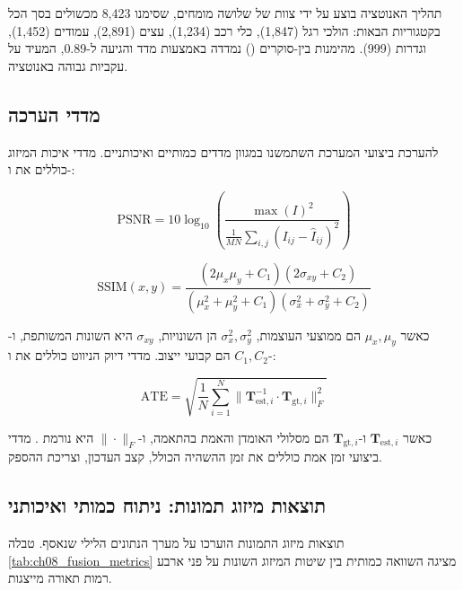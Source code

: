 תהליך האנוטציה בוצע על ידי צוות של שלושה מומחים, שסימנו 8,423 מכשולים בסך הכל בקטגוריות הבאות: הולכי רגל (1,847), כלי רכב (1,234), עצים (2,891), עמודים (1,452), וגדרות (999). מהימנות בין-סוקרים () נמדדה באמצעות מדד  והגיעה ל-0.89, המעיד על עקביות גבוהה באנוטציה.

\subsection{מדדי הערכה}
\label{sec:ch08_metrics}

להערכת ביצועי המערכת השתמשנו במגוון מדדים כמותיים ואיכותניים. מדדי איכות המיזוג כוללים את  ו-:

\begin{equation}
\text{PSNR} = 10 \log_{10} \left( \frac{\max(I)^2}{\frac{1}{MN} \sum_{i,j} (I_{ij} - \hat{I}_{ij})^2} \right)
\label{eq:ch08_psnr}
\end{equation}

\begin{equation}
\text{SSIM}(x, y) = \frac{(2\mu_x \mu_y + C_1)(2\sigma_{xy} + C_2)}{(\mu_x^2 + \mu_y^2 + C_1)(\sigma_x^2 + \sigma_y^2 + C_2)}
\label{eq:ch08_ssim}
\end{equation}

כאשר $\mu_x, \mu_y$ הם ממוצעי העוצמות, $\sigma_x^2, \sigma_y^2$ הן השונויות, $\sigma_{xy}$ היא השונות המשותפת, ו-$C_1, C_2$ הם קבועי ייצוב. מדדי דיוק הניווט כוללים את  ו-:

\begin{equation}
\text{ATE} = \sqrt{\frac{1}{N} \sum_{i=1}^N \| \mathbf{T}_{\text{est}, i}^{-1} \cdot \mathbf{T}_{\text{gt}, i} \|_F^2}
\label{eq:ch08_ate}
\end{equation}

כאשר $\mathbf{T}_{\text{est}, i}$ ו-$\mathbf{T}_{\text{gt}, i}$ הם מסלולי האומדן והאמת בהתאמה, ו-$\|\cdot\|_F$ היא נורמת . מדדי ביצועי זמן אמת כוללים את זמן ההשהיה הכולל, קצב העדכון, וצריכת ההספק.

\subsection{תוצאות מיזוג תמונות: ניתוח כמותי ואיכותני}
\label{sec:ch08_fusion_results}

תוצאות מיזוג התמונות הוערכו על מערך הנתונים הלילי שנאסף. טבלה \ref{tab:ch08_fusion_metrics} מציגה השוואה כמותית בין שיטות המיזוג השונות על פני ארבע רמות תאורה מייצגות.

